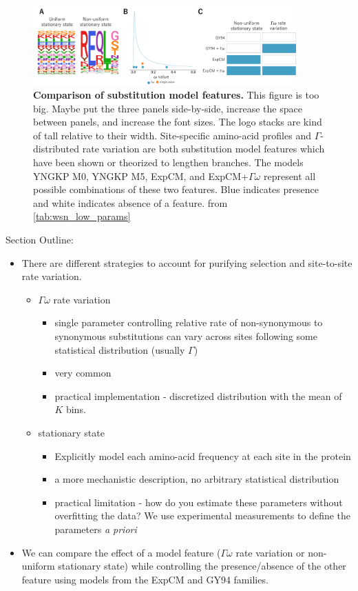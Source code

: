 \documentclass[11pt]{article}
\newcommand\skhcomment[1]{{\color{cyan}#1}}
\newcommand\jdbcomment[1]{{\color{red}#1}}
\begin{document}
\begin{figure}[H]
\centerline{\includegraphics[width=0.90\textwidth]{figures/model_feature.pdf}}
\caption{\label{fig:model_feature}
\textbf{Comparison of substitution model features.}
\jdbcomment{This figure is too big. Maybe put the three panels side-by-side, increase the space between panels, and increase the font sizes. The logo stacks are kind of tall relative to their width.}
Site-specific amino-acid profiles and $\Gamma$-distributed rate variation are both substitution model features which have been shown or theorized to lengthen branches. 
The models YNGKP M0, YNGKP M5, ExpCM, and ExpCM+$\Gamma\omega$ represent all possible combinations of these two features. 
Blue indicates presence and white indicates absence of a feature. 
from \ref{tab:wsn_low_params}
}
\end{figure}

\skhcomment{Section Outline:}


\begin{itemize}
\item There are different strategies to account for purifying selection and site-to-site rate variation. 
\begin{itemize}
\item $\Gamma\omega$ rate variation 
\begin{itemize}
\item single parameter controlling relative rate of non-synonymous to synonymous substitutions can vary across sites following some statistical distribution (usually $\Gamma$)
\item very common 
\item practical implementation - discretized distribution with the mean of $K$ bins. 
\end{itemize}
\item stationary state
\begin{itemize}
\item Explicitly model each amino-acid frequency at each site in the protein 
\item a more mechanistic description, no arbitrary statistical distribution 
\item practical limitation - how do you estimate these parameters without overfitting the data? We use experimental measurements to define the parameters \textit{a priori}
\end{itemize}
\end{itemize}
\item We can compare the effect of a model feature ($\Gamma\omega$ rate variation or non-uniform stationary state) while controlling the presence/absence of the other feature using models from the ExpCM and GY94 families. 
\end{itemize}
\end{document}

